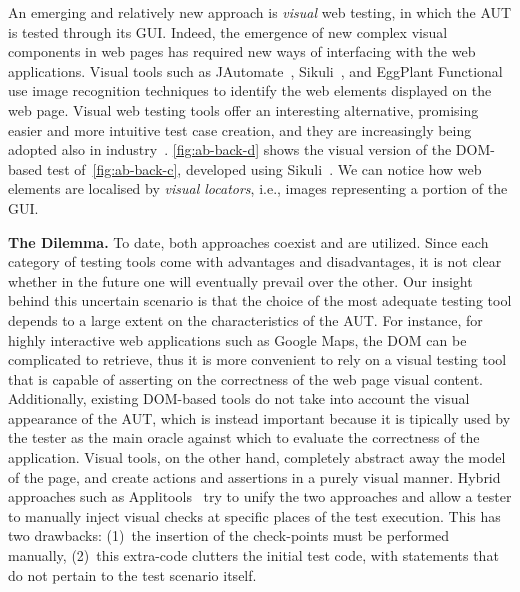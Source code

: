 An emerging and relatively new approach is \textit{visual} web testing, in which the AUT is tested through its GUI. Indeed, the emergence of new complex visual components in web pages has required new ways of interfacing with the web applications. Visual tools such as JAutomate~\cite{Alegroth2013jat}, Sikuli~\cite{Sikuli}, and EggPlant Functional~\cite{eggplant} use image recognition techniques to identify the web elements displayed on the web page. Visual web testing tools offer an interesting alternative, promising easier and more intuitive test case creation, and they are increasingly being adopted also in industry~\cite{Alegroth2013jat}. 
\autoref{fig:ab-back-d} shows the visual version of the DOM-based test of~\autoref{fig:ab-back-c}, developed using Sikuli~\cite{Sikuli}. We can notice how web elements are localised by \textit{visual locators}, i.e., images representing a portion of the GUI.

\noindent
\textbf{The Dilemma.}
To date, both approaches coexist and are utilized. Since each category of testing tools come with advantages and disadvantages, it is not clear whether in the future one will eventually prevail over the other. Our insight behind this uncertain scenario is that the choice of the most adequate testing tool depends to a large extent on the characteristics of the AUT. For instance, for highly interactive web applications such as Google Maps, the DOM can be complicated to retrieve, thus it is more convenient to rely on a visual testing tool that is capable of asserting on the correctness of the web page visual content.
Additionally, existing DOM-based tools do not take into account the visual appearance of the AUT, which is instead important because it is tipically used by the tester as the main oracle against which to evaluate the correctness of the application. Visual tools, on the other hand, completely abstract away the model of the page, and create actions and assertions in a purely visual manner. 
%
Hybrid approaches such as Applitools~\cite{applitools} try to unify the two approaches and allow a tester to manually inject visual checks at specific places of the test execution. This has two drawbacks: (1)~the insertion of the check-points must be performed manually, (2)~this extra-code clutters the initial test code, with statements that do not pertain to the test scenario itself.

